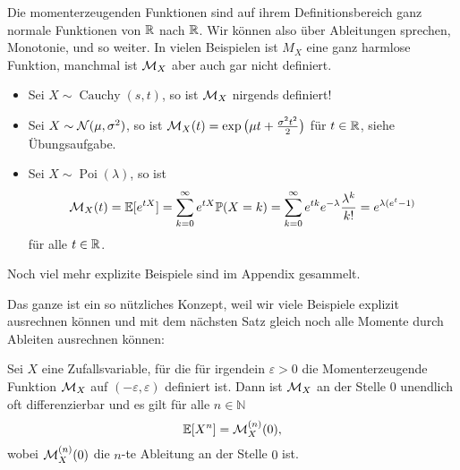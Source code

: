 Die momenterzeugenden Funktionen sind auf ihrem Definitionsbereich ganz normale Funktionen von $\mathbb{R}$ nach $\mathbb{R}$. Wir k\"onnen also \"uber Ableitungen sprechen, Monotonie, und so weiter. In vielen Beispielen ist $M_X$ eine ganz harmlose Funktion, manchmal ist $\mathcal{M}_X$ aber auch gar nicht definiert.
\begin{beispiel} \abs

\begin{itemize}
	\item Sei $ X \sim \operatorname{Cauchy}(s,t)$, so ist $\mathcal{M}_X$ nirgends definiert!
	\item Sei $X \sim \mathcal{N}(\mu, \sigma^2)$, so ist $\mathcal{M}_X(t) = \exp\big(\mu t + \frac{\sigma^2 t^2}{2}\big)$ f\"ur $t\in\mathbb{R}$, siehe \"Ubungsaufgabe.
	\item Sei $X\sim \operatorname{Poi}(\lambda)$, so ist $$\mathcal{M}_X(t) = \mathbb{E}[e^{tX}] = \sum\limits_{k=0}^{\infty} e^{tX} \mathbb{P}(X = k) = \sum\limits_{k=0}^{\infty} e^{tk} e^{-\lambda} \frac{\lambda^k}{k!} = e^{\lambda(e^t - 1)}$$ f\"ur alle $t\in\mathbb{R}$.
	\end{itemize}
Noch viel mehr explizite Beispiele sind im Appendix gesammelt.
\end{beispiel}

Das ganze ist ein so n\"utzliches Konzept, weil wir viele Beispiele explizit ausrechnen k\"onnen und mit dem n\"achsten Satz gleich noch alle Momente durch Ableiten ausrechnen k\"onnen:

\begin{satz}\label{erzeugende}
	Sei $X$ eine Zufallsvariable, f\"ur die f\"ur irgendein $\varepsilon>0$ die Momenterzeugende Funktion $\mathcal{M}_X$ auf $(-\varepsilon, \varepsilon)$ definiert ist. Dann ist $\mathcal{M}_X$ an der Stelle $0$ unendlich oft differenzierbar und es gilt f\"ur alle $n\in\mathbb N$ $$\mathbb{E}[X^n] = \mathcal{M}_X^{(n)}(0),$$ wobei $\mathcal{M}_X^{(n)}(0)$ die $n$-te Ableitung an der Stelle $0$ ist.
\end{satz}





